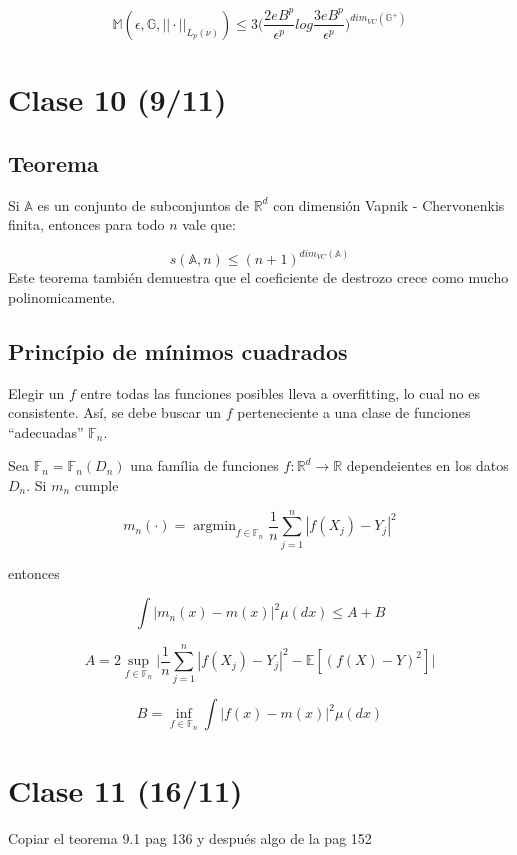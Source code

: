 \documentclass[12pt, a4paper]{article}
\begin{document}
$$
\mathds{M}(\epsilon,\mathds{G},||\cdot||_{L_p(\nu)})\leq 3 \bigg( \frac{2eB^p}{\epsilon^p} log \frac{3eB^p}{\epsilon^p} \bigg)^{dim_{VC}(\mathds{G}^{+})}
$$
\section{Clase 10 (9/11)}
\subsection{Teorema}
Si $\mathds{A}$ es un conjunto de subconjuntos de $\mathds{R}^d$ con dimensión Vapnik - Chervonenkis finita, entonces para todo $n$ vale que:

$$
s(\mathds{A},n)\leq(n+1)^{dim_{VC}(\mathds{A})}
$$
Este teorema también demuestra que el coeficiente de destrozo crece como mucho polinomicamente.

\subsection{Princípio de mínimos cuadrados}
Elegir un $f$ entre todas las funciones posibles lleva a overfitting, lo cual no es consistente. Así, se debe buscar un $f$ perteneciente a una clase de funciones ``adecuadas'' $\mathds{F}_n$.

Sea $\mathds{F}_n=\mathds{F}_n(D_n)$ una família de funciones $f:\mathds{R}^d \rightarrow \mathds{R}$ dependeientes en los datos $D_n$. Si $m_n$ cumple

$$
m_n(\cdot) = \mathop{argmin}_{f\in\mathds{F}_n} \frac{1}{n} \sum_{j=1}^n | f(X_j) - Y_j |^2
$$

entonces

$$
\int |m_n(x) - m(x)|^2 \mu(dx) \leq A + B
$$

$$
A=2 \mathop{sup}_{f\in\mathds{F}_n} \Big| \frac{1}{n} \sum_{j=1}^n |f(X_j)-Y_j|^2 -\mathds{E}[ (f(X)-Y)^2 ] \Big|
$$

$$
B=\mathop{inf}_{f\in\mathds{F}_n} \int | f(x)-m(x) |^2 \mu(dx)
$$

\section{Clase 11 (16/11)}
Copiar el teorema 9.1  pag 136 y después algo de la pag 152
\end{document}
